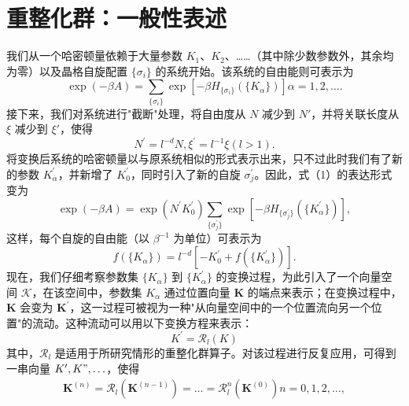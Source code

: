 \section{重整化群：一般性表述}\label{ux91cdux6574ux5316ux7fa4ux4e00ux822cux6027ux8868ux8ff0}
我们从一个哈密顿量依赖于大量参数 \(K_{1}\)、\(K_{2}\)、\ldots\ldots（其中除少数参数外，其余均为零）以及晶格自旋配置 \(\{\sigma_{i}\}\) 的系统开始。该系统的自由能则可表示为
\begin{equation}\tag{14.3.1}\label{eq:14.3.1}
\exp ( - \beta A ) = \sum _ { \{ \sigma _ { i } \} } \exp [ - \beta H _ { \{ \sigma _ { i } \} } ( \{ K _ { \alpha } \} ) ]  \alpha = 1 , 2 , \ldots .
\end{equation}
接下来，我们对系统进行"截断"处理，将自由度从 \(N\) 减少到 \(N'\)，并将关联长度从 \(\xi\) 减少到 \(\xi'\)，使得
\begin{equation}\tag{14.3.2}\label{eq:14.3.2}
N ^{\prime} = l ^{- d} N ,  \xi ^{\prime} = l ^{- 1} \xi  ( l > 1 ) .
\end{equation}
将变换后系统的哈密顿量以与原系统相似的形式表示出来，只不过此时我们有了新的参数 \(K_{\alpha}^{\prime}\)，并新增了 \(K_{0}^{\prime}\)，同时引入了新的自旋 \(\sigma_{j}^{\prime}\)。因此，式（1）的表达形式变为
\begin{equation}\tag{14.3.3}\label{eq:14.3.3}
\exp ( - \beta A ) = \exp ( N ^{\prime} K _ { 0 } ^{\prime} ) \sum _ { \{ \sigma _ { j } ^{\prime} \} } \exp \left[ - \beta H _ { \{ \sigma _ { j } ^{\prime} \} } ( \{ K _ { \alpha } ^{\prime} \} ) \right] ,
\end{equation}
这样，每个自旋的自由能（以 \(\beta^{-1}\) 为单位）可表示为
\begin{equation}\tag{14.3.4}\label{eq:14.3.4}
f ( \{ K _ { \alpha } \} ) = l ^{- d} [ - K _ { 0 } ^{\prime} + f ( \{ K _ { \alpha } ^{\prime} \} ) ] .
\end{equation}
现在，我们仔细考察参数集 \(\{K_{\alpha}\}\) 到 \(\{K_{\alpha}^{\prime}\}\) 的变换过程，为此引入了一个向量空间 \(\mathcal{K}\)，在该空间中，参数集 \(K_{\alpha}\) 通过位置向量 \(\mathbf{K}\) 的端点来表示；在变换过程中，\(\mathbf{K}\) 会变为 \(\mathbf{K}^{\prime}\)，这一过程可被视为一种"从向量空间中的一个位置流向另一个位置"的流动。这种流动可以用以下变换方程来表示：
\begin{equation}\tag{14.3.5}\label{eq:14.3.5}
K ^{\prime} = \mathcal { R } _ { l } ( K )
\end{equation}
其中，\(\mathcal{R}_{l}\) 是适用于所研究情形的重整化群算子。对该过程进行反复应用，可得到一串向量 \(K', K", \ldots\)，使得
\begin{equation}\tag{14.3.6}\label{eq:14.3.6}
\begin{array}{r} { \pmb { K } ^{( n )} = \mathcal { R } _ { l } ( \pmb { K } ^{( n - 1 )} ) = \ldots = \mathcal { R } _ { l } ^{n} ( \pmb { K } ^{( 0 )} )  n = 0 , 1 , 2 , \ldots , } \end{array}
\end{equation}
